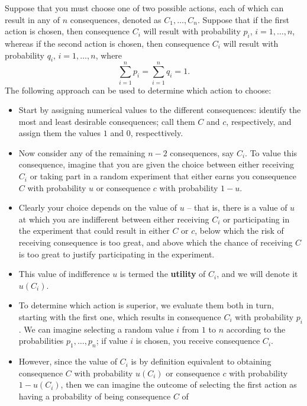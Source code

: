 \begin{changebar}
    \begin{example}[Utility]
        Suppose that you must choose one of two possible actions, each of which can result in any of $n$ consequences, denoted as $C_1, \dots, C_n$. Suppose that if the first action is chosen, then consequence $C_i$ will result with probability $p_i$, $i = 1, \dots, n$, whereas if the second action is chosen, then consequence $C_i$ will result with probability $q_i$, $i = 1, \dots, n$, where \[
            \sum^n_{i = 1} p_i = \sum^n_{i = 1} q_i = 1.    
        \] The following approach can be used to determine which action to choose: \begin{itemize}
            \item Start by assigning numerical values to the different consequences: identify the most and least desirable consequences; call them $C$ and $c$, respectively, and assign them the values $1$ and $0$, respecttively.
            \item Now consider any of the remaining $n - 2$ consequences, say $C_i$. To value this consequence, imagine that you are given the choice between either receiving $C_i$ or taking part in a random experiment that either earns you consequence $C$ with probability $u$ or consequence $c$ with probability $1 - u$. 
            \item Clearly your choice depends on the value of $u$ -- that is, there is a value of $u$ at which you are indifferent between either receiving $C_i$ or participating in the experiment that could result in either $C$ or $c$, below which the risk of receiving consequence is too great, and above which the chance of receiving $C$ is too great to justify participating in the experiment.
            \item This value of indifference $u$ is termed the \textbf{utility} of $C_i$, and we will denote it $u(C_i)$.
            \item To determine which action is superior, we evaluate them both in turn, starting with the first one, which results in consequence $C_i$ with probability $p_i$. We can imagine selecting a random value $i$ from $1$ to $n$ according to the probabilities $p_1, \dots, p_n$; if value $i$ is chosen, you receive consequence $C_i$. 
            \item However, since the value of $C_i$ is by definition equivalent to obtaining consequence $C$ with probability $u(C_i)$ or consequence $c$ with probability $1 - u(C_i)$, then we can imagine the outcome of selecting the first action as having a probability of being consequence $C$ of \[
\]
\end{itemize}
\end{example}
\end{changebar}
